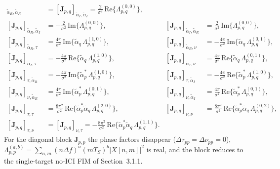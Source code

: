 \documentclass[11pt]{article}
\begin{document}
\begin{align}
    [\bm{J}_{p,q}]_{\tilde{\alpha}_R,\tilde{\alpha}_R} &= [\bm{J}_{p,q}]_{\tilde{\alpha}_I,\tilde{\alpha}_I} = \tfrac{2}{\sigma^2}\, \text{Re}\{ \Lambda_{p,q}^{(0,0)} \}, \\
    [\bm{J}_{p,q}]_{\tilde{\alpha}_R,\tilde{\alpha}_I} &= -\tfrac{2}{\sigma^2}\, \text{Im}\{ \Lambda_{p,q}^{(0,0)} \}, &
    [\bm{J}_{p,q}]_{\tilde{\alpha}_I,\tilde{\alpha}_R} &= \tfrac{2}{\sigma^2}\, \text{Im}\{ \Lambda_{p,q}^{(0,0)} \}, \\
    [\bm{J}_{p,q}]_{\tilde{\alpha}_R,\tau} &= \tfrac{4\pi}{\sigma^2}\, \text{Im}\{ \tilde{\alpha}_q\, \Lambda_{p,q}^{(1,0)} \}, &
    [\bm{J}_{p,q}]_{\tilde{\alpha}_R,\nu} &= -\tfrac{4\pi}{\sigma^2}\, \text{Im}\{ \tilde{\alpha}_q\, \Lambda_{p,q}^{(0,1)} \}, \\
    [\bm{J}_{p,q}]_{\tilde{\alpha}_I,\tau} &= -\tfrac{4\pi}{\sigma^2}\, \text{Re}\{ \tilde{\alpha}_q\, \Lambda_{p,q}^{(1,0)} \}, &
    [\bm{J}_{p,q}]_{\tilde{\alpha}_I,\nu} &= \tfrac{4\pi}{\sigma^2}\, \text{Re}\{ \tilde{\alpha}_q\, \Lambda_{p,q}^{(0,1)} \}, \\
    [\bm{J}_{p,q}]_{\tau,\tilde{\alpha}_R} &= -\tfrac{4\pi}{\sigma^2}\, \text{Im}\{ \tilde{\alpha}_p^*\, \Lambda_{p,q}^{(1,0)} \}, &
    [\bm{J}_{p,q}]_{\tau,\tilde{\alpha}_I} &= -\tfrac{4\pi}{\sigma^2}\, \text{Re}\{ \tilde{\alpha}_p^*\, \Lambda_{p,q}^{(1,0)} \}, \\
    [\bm{J}_{p,q}]_{\nu,\tilde{\alpha}_R} &= \tfrac{4\pi}{\sigma^2}\, \text{Im}\{ \tilde{\alpha}_p^*\, \Lambda_{p,q}^{(0,1)} \}, &
    [\bm{J}_{p,q}]_{\nu,\tilde{\alpha}_I} &= \tfrac{4\pi}{\sigma^2}\, \text{Re}\{ \tilde{\alpha}_p^*\, \Lambda_{p,q}^{(0,1)} \}, \\
    [\bm{J}_{p,q}]_{\tau,\tau} &= \tfrac{8\pi^2}{\sigma^2}\, \text{Re}\{ \tilde{\alpha}_p^* \tilde{\alpha}_q\, \Lambda_{p,q}^{(2,0)} \}, &
    [\bm{J}_{p,q}]_{\nu,\nu} &= \tfrac{8\pi^2}{\sigma^2}\, \text{Re}\{ \tilde{\alpha}_p^* \tilde{\alpha}_q\, \Lambda_{p,q}^{(0,2)} \}, \\
    [\bm{J}_{p,q}]_{\tau,\nu} &= [\bm{J}_{p,q}]_{\nu,\tau} = -\tfrac{8\pi^2}{\sigma^2}\, \text{Re}\{ \tilde{\alpha}_p^* \tilde{\alpha}_q\, \Lambda_{p,q}^{(1,1)} \}.
\end{align}
For the diagonal block \(\bm{J}_{p,p}\) the phase factors disappear (\(\Delta\tau_{pp}=\Delta\nu_{pp}=0\)), \(\Lambda_{p,p}^{(a,b)} = \sum_{n,m}(n\Delta f)^a(mT_S)^b|X[n,m]|^2\) is real, and the block reduces to the single-target no-ICI FIM of Section~3.1.1.
\end{document}
